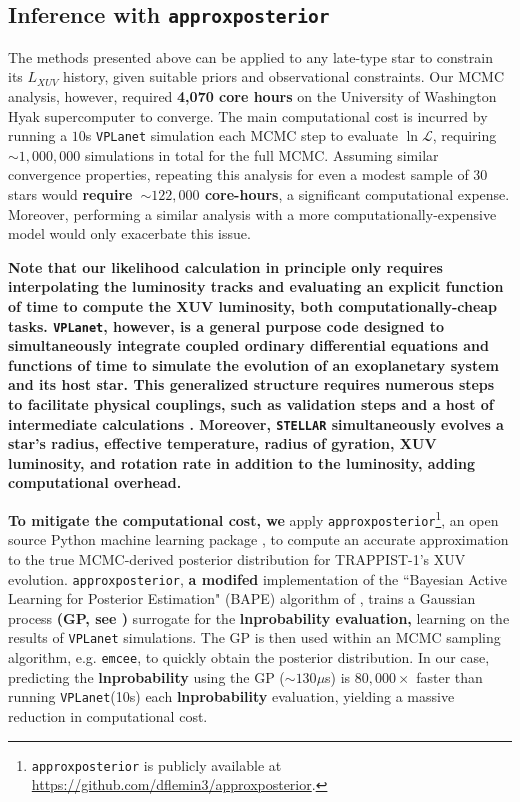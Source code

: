 \documentclass[twocolumn]{aastex62}
\newcommand{\xxx}[1]{{\textbf{#1}}}
\newcommand{\vplanet}[0]{\texttt{VPLanet}\xspace}
\newcommand{\emcee}[0]{\texttt{emcee}\xspace}
\newcommand{\approxposterior}[0]{\texttt{approxposterior}\xspace}
\newcommand{\stellar}[0]{\texttt{STELLAR}\xspace}
\begin{document}
\subsection{Inference with \approxposterior} \label{sec:methods:approx}

The methods presented above can be applied to any late-type star to constrain its $L_{XUV}$ history, given suitable priors and observational constraints. Our MCMC analysis, however, required \xxx{4,070 core hours} on the University of Washington Hyak supercomputer to converge. The main computational cost is incurred by running a $10$s \vplanet simulation each MCMC step to evaluate $\ln \mathcal{L}$, requiring ${\sim}1,000,000$ simulations in total for the full MCMC. Assuming similar convergence properties, repeating this analysis for even a modest sample of 30 stars would \xxx{require~${\sim} 122,000$ core-hours}, a significant computational expense. Moreover, performing a similar analysis with a more computationally-expensive model would only exacerbate this issue.

\xxx{Note that our likelihood calculation in principle only requires interpolating the \citet{Baraffe2015} luminosity tracks and evaluating an explicit function of time to compute the XUV luminosity, both computationally-cheap tasks. \vplanet, however, is a general purpose code designed to simultaneously integrate coupled ordinary differential equations and functions of time to simulate the evolution of an exoplanetary system and its host star. This generalized structure requires numerous steps to facilitate physical couplings, such as validation steps and a host of intermediate calculations \citep[for more details, see][]{Barnes2019}. Moreover, \stellar simultaneously evolves a star's radius, effective temperature, radius of gyration, XUV luminosity, and rotation rate in addition to the luminosity, adding computational overhead.}

\xxx{To mitigate the computational cost, we} apply \approxposterior\footnote{\approxposterior is publicly available at \href{https://github.com/dflemin3/approxposterior}{https://github.com/dflemin3/approxposterior}.}, an open source Python machine learning package \citep{FlemingVanderPlas2018}, to compute an accurate approximation to the true MCMC-derived posterior distribution for TRAPPIST-1's XUV evolution. \approxposterior, \xxx{a modifed} implementation of the ``Bayesian Active Learning for Posterior Estimation" (BAPE) algorithm of \citet{Kandasamy2017}, trains a Gaussian process \xxx{(GP, see \citet{Rasmussen2006})} surrogate for the \xxx{lnprobability evaluation,} learning on the results of \vplanet simulations. The GP is then used within an MCMC sampling algorithm, e.g. \emcee, to quickly obtain the posterior distribution. In our case, predicting the \xxx{lnprobability} using the GP (${\sim} 130 \mu$s) is $80,000 \times$ faster than running \vplanet (10s) each \xxx{lnprobability} evaluation, yielding a massive reduction in computational cost.
\end{document}
